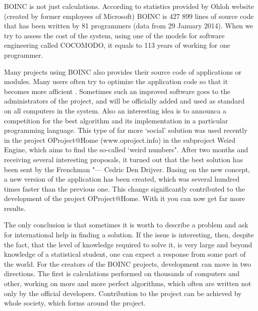 \documentclass[10pt, a5paper]{article}
\begin{document}
BOINC is not just calculations. According to statistics provided by Ohloh website (created by former employees of Microsoft) BOINC is 427 899 lines of source code that has been written by 81 programmers (data from 29 January 2014). When we try to assess the cost of the system, using one of the models for software engineering called COCOMODO, it equals to 113 years of working for one programmer.

Many projects using BOINC also provides their source code of applications or modules. Many users often try to optimize the application code so that it becomes more afficient . Sometimes such an improved software goes to the administrators of the project, and will be officially added and used as standard on all computers in the system. Also an interesting idea is to announca a competition for the best algorithm and its implementation in a particular programming language. This type of far more `social' solution was used recently in the project OProject@Home (www.oproject.info) in the subproject Weird Engine, which aims to find the so-called `weird numbers". After two months and receiving several interesting proposals, it turned out that the best solution has been sent by the Frenchman "--- Cedric Den Drijver. Basing on the new concept, a new version of the application has been created, which was several hundred times faster than the previous one. This change significantly contributed to the development of the project OProject@Home. With it you can now get far more results.

The only conclusion is that sometimes it is worth to describe a problem and ask for international help in finding a solution. If the issue is interesting, then, despite the fact, that the level of knowledge required to solve it, is very large and beyond knowledge of a statistical student, one can expect a response from some part of the world. For the creators of the BOINC projects, development can move in two directions. The first is calculations performed on thousands of computers and other, working on more and more perfect algorithms, which often are written not only by the official developers. Contribution to the project can be achieved by whole society, which forms around the project.
\end{document}

